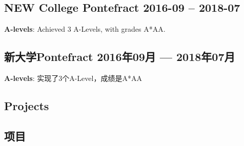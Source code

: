 \documentclass[cv.tex]{subfiles}
\begin{document}
\begin{xen}
    \subsection{NEW College Pontefract
        \hfill 2016-09 -- 2018-07}
        \textbf{A-levels}: Achieved 3 A-Levels, with grades A*AA.
\end{xen}
\begin{xcn}
        \subsection{新大学Pontefract
            \hfill 2016年09月 --- 2018年07月}
            \textbf{A-levels}: 实现了3个A-Level，成绩是A*AA
\end{xcn}
\begin{xen}
\section{Projects}
\end{xen}
\begin{xcn}
\section{项目}
\end{xcn}
\end{document}
